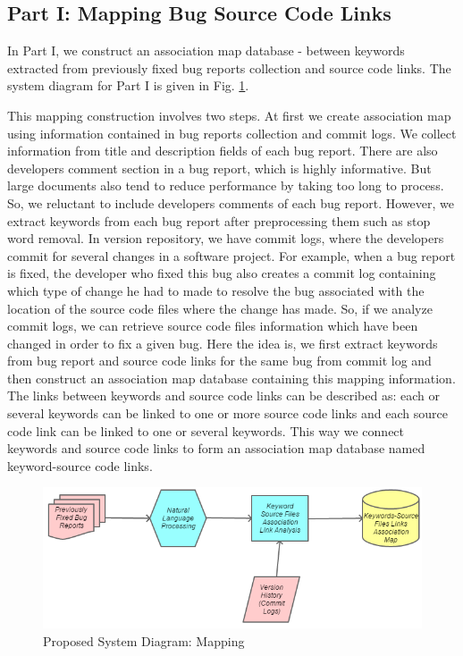 \documentclass[conference]{IEEEtran}
\begin{document}
\subsection{Part I: Mapping Bug Source Code Links}
In Part I, we construct an association map database - between keywords extracted from previously fixed bug reports collection and source code links. The system diagram for Part I is given in Fig. \ref{fig:MP}.

This mapping construction involves two steps.
At first we create association map using information contained in bug reports collection and commit logs. We collect information from title and description fields of each bug report. There are also developers comment section in a bug report, which is highly informative. But large documents also tend to reduce performance by taking too long to process. So, we reluctant to include developers comments of each bug report. However, we extract keywords from each bug report after preprocessing them such as stop word removal. 
In version repository, we have commit logs, where the developers commit for several changes in a software project. For example, when a bug report is fixed, the developer who fixed this bug also creates a commit log containing which type of change he had to made to resolve the bug associated with the location of the source code files where the change has made. So, if we analyze commit logs, we can retrieve source code files information which have been changed in order to fix a given bug. Here the idea is, we first extract keywords from bug report and source code links for the same bug from commit log and then construct an association map database containing this mapping information. The links between keywords and source code links can be described as: each or several keywords can be linked to one or more source code links and each source code link can be linked to one or several keywords. This way we connect keywords and source code links to form an association map database named keyword-source code links. 

\begin{figure}
	\centering
	\includegraphics[scale=0.55]{Map}
	\caption{Proposed System Diagram: Mapping}
	\label{fig:MP}
\end{figure}
\end{document}
